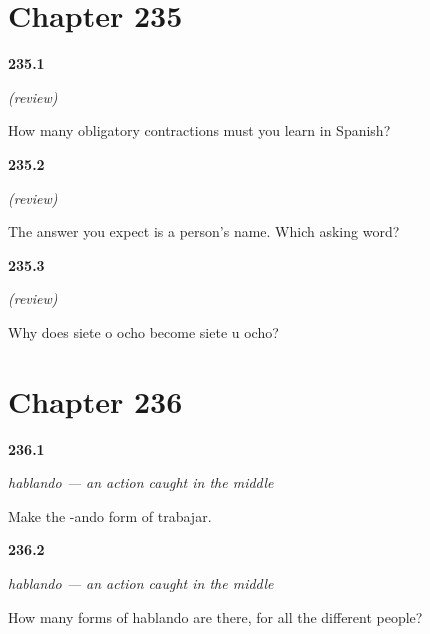 \section*{Chapter 235}

\noindent\begin{minipage}[t]{\linewidth}
\raggedright
\hypertarget{review-ES-C61-repaso-juntores-count}{\textbf{235.1}} \emph{(review)}\par
\small How many obligatory contractions must you learn in Spanish?
\end{minipage}\par\medskip

\noindent\begin{minipage}[t]{\linewidth}
\raggedright
\hypertarget{review-ES-C61-repaso-juntores-who}{\textbf{235.2}} \emph{(review)}\par
\small The answer you expect is a person's name. Which asking word?
\end{minipage}\par\medskip

\noindent\begin{minipage}[t]{\linewidth}
\raggedright
\hypertarget{review-ES-C61-repaso-juntores-u}{\textbf{235.3}} \emph{(review)}\par
\small Why does siete o ocho become siete u ocho?
\end{minipage}\par\medskip

\section*{Chapter 236}

\noindent\begin{minipage}[t]{\linewidth}
\raggedright
\hypertarget{review-ES-C62-hablando-make}{\textbf{236.1}} \emph{hablando — an action caught in the middle}\par
\small Make the -ando form of trabajar.
\end{minipage}\par\medskip

\noindent\begin{minipage}[t]{\linewidth}
\raggedright
\hypertarget{review-ES-C62-hablando-agree}{\textbf{236.2}} \emph{hablando — an action caught in the middle}\par
\small How many forms of hablando are there, for all the different people?
\end{minipage}\par\medskip

